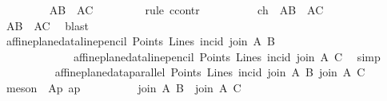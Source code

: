 \begin{isabellebody}
\ \ \ \ \ \ \isamarkupfalse%
\ {}{}{\isacharcolon}{\kern0pt}\ {\isachardoublequoteopen}{\isacharquery}{\kern0pt}AB\ {\isasymnoteq}\ {\isacharquery}{\kern0pt}AC{\isachardoublequoteclose}\ \isanewline
\ \ \ \ \ \ \isamarkupfalse%
\ {\isacharparenleft}{\kern0pt}rule\ ccontr{\isacharparenright}{\kern0pt}\isanewline
\ \ \ \ \ \ \ \ \isamarkupfalse%
\ ch{\isacharcolon}{\kern0pt}\ {\isachardoublequoteopen}{\isasymnot}\ {\isacharparenleft}{\kern0pt}{\isacharquery}{\kern0pt}AB\ {\isasymnoteq}\ {\isacharquery}{\kern0pt}AC{\isacharparenright}{\kern0pt}{\isachardoublequoteclose}\isanewline
\ \ \ \ \ \ \ \ \isamarkupfalse%
\ {\isachardoublequoteopen}{\isacharquery}{\kern0pt}AB\ {\isacharequal}{\kern0pt}\ {\isacharquery}{\kern0pt}AC{\isachardoublequoteclose}\ \isamarkupfalse%
\ blast\isanewline
\ \ \ \ \ \ \ \ \isamarkupfalse%
\ {\isachardoublequoteopen}{\isacharparenleft}{\kern0pt}affine{\isacharunderscore}{\kern0pt}plane{\isacharunderscore}{\kern0pt}data{\isachardot}{\kern0pt}line{\isacharunderscore}{\kern0pt}pencil\ Points\ Lines\ {\isacharparenleft}{\kern0pt}incid{\isacharparenright}{\kern0pt}\ {\isacharparenleft}{\kern0pt}join\ A\ B{\isacharparenright}{\kern0pt}{\isacharparenright}{\kern0pt}\ {\isacharequal}{\kern0pt}\isanewline
\ \ \ \ \ \ \ \ \ \ \ \ \ {\isacharparenleft}{\kern0pt}affine{\isacharunderscore}{\kern0pt}plane{\isacharunderscore}{\kern0pt}data{\isachardot}{\kern0pt}line{\isacharunderscore}{\kern0pt}pencil\ Points\ Lines\ {\isacharparenleft}{\kern0pt}incid{\isacharparenright}{\kern0pt}\ {\isacharparenleft}{\kern0pt}join\ A\ C{\isacharparenright}{\kern0pt}{\isacharparenright}{\kern0pt}{\isachardoublequoteclose}\ \isamarkupfalse%
\ simp\isanewline
\ \ \ \ \ \ \ \ \isamarkupfalse%
\ {\isachardoublequoteopen}affine{\isacharunderscore}{\kern0pt}plane{\isacharunderscore}{\kern0pt}data{\isachardot}{\kern0pt}parallel\ Points\ Lines\ incid\ {\isacharparenleft}{\kern0pt}join\ A\ B{\isacharparenright}{\kern0pt}\ {\isacharparenleft}{\kern0pt}join\ A\ C{\isacharparenright}{\kern0pt}{\isachardoublequoteclose}\ \isamarkupfalse%
\ {\isacharparenleft}{\kern0pt}meson\ {\isachardoublequoteopen}{}{}{\isachardoublequoteclose}\ Ap{}{}\ ap{\isacharparenright}{\kern0pt}\isanewline
\ \ \ \ \ \ \ \ \isamarkupfalse%
\ {\isachardoublequoteopen}{\isacharparenleft}{\kern0pt}join\ A\ B{\isacharparenright}{\kern0pt}\ {\isacharequal}{\kern0pt}\ {\isacharparenleft}{\kern0pt}join\ A\ C{\isacharparenright}{\kern0pt}{\isachardoublequoteclose}\ \isamarkupfalse%

\end{isabellebody}
